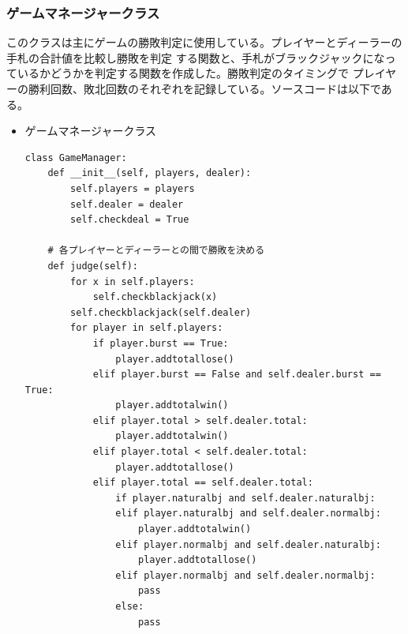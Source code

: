 \subsubsection{ゲームマネージャークラス}
このクラスは主にゲームの勝敗判定に使用している。プレイヤーとディーラーの手札の合計値を比較し勝敗を判定
する関数と、手札がブラックジャックになっているかどうかを判定する関数を作成した。勝敗判定のタイミングで
プレイヤーの勝利回数、敗北回数のそれぞれを記録している。ソースコードは以下である。
\begin{itemize}
\item ゲームマネージャークラス
\begin{lstlisting}
class GameManager:
    def __init__(self, players, dealer):
        self.players = players
        self.dealer = dealer
        self.checkdeal = True

    # 各プレイヤーとディーラーとの間で勝敗を決める
    def judge(self):
        for x in self.players:
            self.checkblackjack(x)
        self.checkblackjack(self.dealer)
        for player in self.players:
            if player.burst == True:
                player.addtotallose()
            elif player.burst == False and self.dealer.burst == True:
                player.addtotalwin()
            elif player.total > self.dealer.total:
                player.addtotalwin()
            elif player.total < self.dealer.total:
                player.addtotallose()
            elif player.total == self.dealer.total:
                if player.naturalbj and self.dealer.naturalbj:
                elif player.naturalbj and self.dealer.normalbj:
                    player.addtotalwin()
                elif player.normalbj and self.dealer.naturalbj:
                    player.addtotallose()
                elif player.normalbj and self.dealer.normalbj:
                    pass
                else:
                    pass
\end{lstlisting}
\end{itemize}

